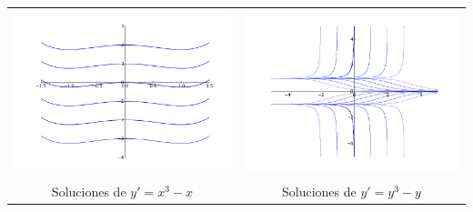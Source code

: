 \documentclass{article}
\begin{document}
\begin{tabular}{cc}
\includegraphics[scale=.3]{imagenes/sol_paralelas.png} &\hspace{-1.5cm}\includegraphics[scale=.3]{imagenes/sol_paralelas2.png} \\
Soluciones de $y'=x^3-x$ &\hspace{-1.5cm}Soluciones de $y'=y^3-y$
\end{tabular}
\end{document}

